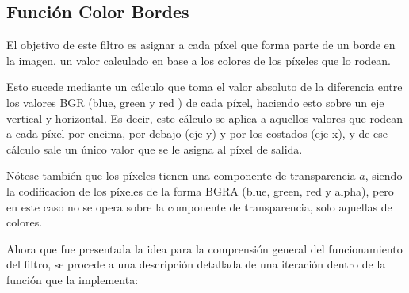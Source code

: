 \subsection{Función Color Bordes}

\par El objetivo de este filtro es asignar a cada píxel que forma parte de un borde en la imagen,
un valor calculado en base a los colores de los píxeles que lo rodean.

\par Esto sucede mediante un cálculo que toma el valor absoluto de la diferencia entre los
valores BGR (blue, green y red ) de cada píxel, haciendo esto sobre un eje vertical y
horizontal. Es decir, este cálculo se aplica a aquellos valores que rodean a cada píxel
por encima, por debajo (eje y) y por los costados (eje x), y de ese cálculo sale un
único valor que se le asigna al píxel de salida.
\par Nótese también que los píxeles tienen una componente de transparencia $a$, siendo la
codificacion de los píxeles de la forma BGRA (blue, green, red y alpha), pero en este caso
no se opera sobre la componente de transparencia, solo aquellas de colores.

\par Ahora que fue presentada la idea para la comprensión general del funcionamiento del filtro,
se procede a una descripción detallada de una iteración dentro de la función que
la implementa:



